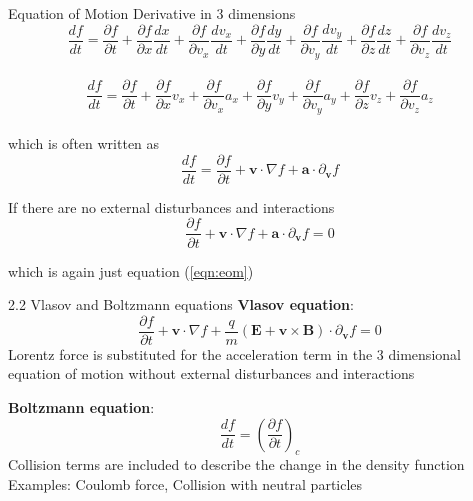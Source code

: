 \documentclass{beamer}
\begin{document}
	\begin{frame}[t]{Equation of Motion}
		Derivative in 3 dimensions
		$$ \frac{df}{dt} = \frac{\partial f}{\partial t} + \frac{\partial f}{\partial x} \frac{d x}{d t} + \frac{\partial f}{\partial v_{x}} \frac{d v_{x}}{d t} + \frac{\partial f}{\partial y} \frac{d y}{d t} + \frac{\partial f}{\partial v_{y}} \frac{d v_{y}}{d t} + \frac{\partial f}{\partial z} \frac{d z}{d t} + \frac{\partial f}{\partial v_{z}} \frac{d v_{z}}{d t}$$\\
		
		$$ \frac{df}{dt} = \frac{\partial f}{\partial t} + \frac{\partial f}{\partial x} v_{x} + \frac{\partial f}{\partial v_{x}} a_{x} + \frac{\partial f}{\partial y} v_{y} + \frac{\partial f}{\partial v_{y}} a_{y} + \frac{\partial f}{\partial z} v_{z} + \frac{\partial f}{\partial v_{z}} a_{z}$$\\
		
		which is often written as $$\frac{df}{dt} = \frac{\partial f}{\partial t} + \textbf{v} \cdot \nabla f + \textbf{a} \cdot {\partial}_{\textbf{v}} f $$
		
		If there are no external disturbances and interactions
		$$\frac{\partial f}{\partial t} + \textbf{v} \cdot \nabla f + \textbf{a} \cdot {\partial}_{\textbf{v}} f = 0$$
		
		which is again just equation (\ref{eqn:eom})
	\end{frame}

	\begin{frame}[t]{2.2 Vlasov and Boltzmann equations}
		\textbf{Vlasov equation}: 
		\begin{equation}
			\label{eqn:vlasov}
			\frac{\partial f}{\partial t} + \textbf{v} \cdot \nabla f + \frac{q}{m} \left(\mathrm{\textbf{E}}+\textbf{v} \times \mathrm{\textbf{B}} \right) \cdot {\partial}_{\textbf{v}} f = 0
		\end{equation}
	Lorentz force is substituted for the acceleration term in the 3 dimensional equation of motion without external disturbances and interactions
	
	\vspace{10pt}
		\textbf{Boltzmann equation}:
		\begin{equation}
			\label{eqn:boltzmann}
			\frac{df}{dt} = \left(\frac{\partial f}{\partial t}\right)_{c} 
		\end{equation}
	Collision terms are included to describe the change in the density function\\
	Examples: Coulomb force, Collision with neutral particles
		
	\end{frame}
\end{document}

